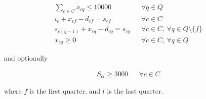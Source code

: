 \documentclass[a4paper]{article}
\begin{document}
\begin{align}
\sum_{c \in C} x_{cq} \leq 10000 && \forall q \in Q \label{C1}\\
i_{c} +  x_{cf} - d_{cf} = s_{cf} && \forall c \in C \label{C2}\\
s_{c(q - 1)} +  x_{cq} - d_{cq} = s_{cq} && \forall c \in C,\  \forall q \in Q \setminus \{ f \} \label{C3}\\
x_{cq} \geq 0 && \forall c \in C,\  \forall q \in Q \label{C4}
\end{align}

and optionally

\begin{align}
    S_{cl} \geq 3000 && \forall c \in C
\end{align}

where $f$ is the first quarter, and $l$ is the last quarter. 
\end{document}

